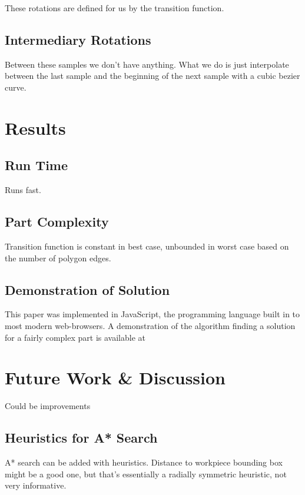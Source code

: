 These rotations are defined for us by the transition function.

	\subsection{Intermediary Rotations}

Between these samples we don't have anything. What we do is just interpolate between the last sample and the beginning of the next sample with a cubic bezier curve.

\section{Results}

	\subsection{Run Time}

Runs fast.

	\subsection{Part Complexity}

Transition function is constant in best case, unbounded in worst case based on the number of polygon edges.

	\subsection{Demonstration of Solution}

This paper was implemented in JavaScript, the programming language built in to most modern web-browsers. A demonstration of the algorithm finding a solution for a fairly complex part is available at



\section{Future Work \& Discussion}

Could be improvements

	\subsection{Heuristics for A* Search}

A* search can be added with heuristics. Distance to workpiece bounding box might be a good one, but that's essentially a radially symmetric heuristic, not very informative.
